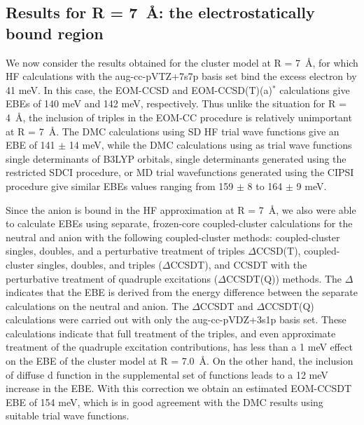 \subsection{Results for R = \SI{7}{\angstrom}: the electrostatically bound region}

We now consider the results obtained for the  cluster model at R = \SI{7}{\angstrom}, for which HF calculations with the aug-cc-pVTZ+7s7p basis set bind the excess electron by 41 meV.
In this case, the EOM-CCSD and EOM-CCSD(T)(a)$^{*}$ calculations give EBEs of 140 meV and 142 meV, respectively.
Thus unlike the situation for R = \SI{4}{\angstrom}, the inclusion of triples in the EOM-CC procedure is relatively unimportant at R = \SI{7}{\angstrom}.
The DMC calculations using SD HF trial wave functions give an EBE of 141 $\pm$ 14 meV, while the DMC calculations using as trial wave functions single determinants of B3LYP orbitals, single determinants generated using the restricted SDCI procedure, or MD trial wavefunctions generated using the CIPSI procedure give similar EBEs values ranging  from 159 $\pm$ 8 to 164 $\pm$ 9 meV. 

Since the anion is bound in the HF approximation at R = \SI{7}{\angstrom}, we also were able to calculate EBEs using separate, frozen-core coupled-cluster calculations for the neutral and anion with the following coupled-cluster methods: coupled-cluster singles, doubles, and a perturbative treatment of triples $\Delta$CCSD(T)\cite{10.1016/S0009-26148987395-6}, coupled-cluster singles, doubles, and triples ($\Delta$CCSDT)\cite{10.1063/1.5128795,10.1063/1.452353,10.1016/0009-26148880110-6,10.1063/1.459002}, and CCSDT with the perturbative treatment of quadruple excitations ($\Delta$CCSDT(Q))\cite{10.1063/1.1950567} methods.
The $\Delta$ indicates that the EBE is derived from the energy difference between the separate calculations on the neutral and anion. The $\Delta$CCSDT and $\Delta$CCSDT(Q) calculations were carried out with only the aug-cc-pVDZ+3s1p basis set.
These calculations indicate that full treatment of the triples, and even approximate treatment of the quadruple excitation contributions, has less than a 1 meV effect on the EBE of the  cluster model at R = \SI{7.0}{\angstrom}.
On the other hand, the inclusion of diffuse d function in the supplemental set of functions leads to a 12 meV increase in the EBE. With this correction we obtain an estimated EOM-CCSDT EBE of 154 meV, which is in good agreement with the DMC results using suitable trial wave functions.


